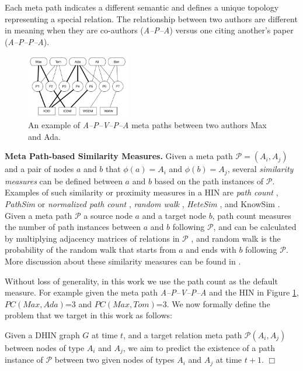 Each meta path indicates a different semantic and defines a unique topology representing a special relation. The relationship between two authors are different in meaning when they are co-authors (\textit{A--P--A}) versus one citing another's paper (\textit{A--P--P--A}).

\begin{figure}[t]
\centering
\includegraphics[width=0.4\textwidth]{figs/exampleSocialNetwork.pdf}
\caption{An example of \textit{A--P--V--P--A} meta paths between two authors Max and Ada.}
\label{sampleNetwork}
\end{figure}

\textbf{Meta Path-based Similarity Measures.} Given a meta path $\mathcal{P} = (A_i,A_j)$ and a pair of nodes $a$ and $b$ that $\phi(a)=A_i$ and $\phi(b)=A_{j}$, several \textit{similarity measures} can be defined between $a$ and $b$ based on the path instances of $\mathcal{P}$. Examples of such similarity or proximity measures in a HIN are \textit{path count} \cite{sun2011pathsim,sun2011ASONAM}, \textit{PathSim} \cite{sun2011pathsim} or \textit{normalized path count} \cite{sun2011ASONAM}, \textit{random walk} \cite{sun2011ASONAM}, \textit{HeteSim} \cite{shi2014hetesim}, and KnowSim \cite{wang2016text}. Given a meta path $\mathcal{P}$ a source node $a$ and a target node $b$, path count measures the number of path instances between $a$ and $b$ following $\mathcal{P}$, and can be calculated by multiplying adjacency matrices of relations in $\mathcal{P}$ \cite{sun2011ASONAM}, and random walk is the probability of the random walk that starts from $a$ and ends with $b$ following $\mathcal{P}$. More discussion about these similarity measures can be found in \cite{shi2014hetesim,sun2011ASONAM,sun2011pathsim}. 

Without loss of generality, in this work we use the path count as the default measure. For example given the meta path \textit{A--P--V--P--A} and the HIN in Figure \ref{sampleNetwork}, $PC(Max,Ada)$=3 and $PC(Max,Tom)$=3. We now formally define the problem that we target in this work as follows:

\begin{definition}\label{problemdef}Given a DHIN graph $G$ at time $t$, and a target relation meta path $\mathcal{P}(A_i,A_j)$ between nodes of type $A_i$ and $A_j$, we aim to predict the existence of a path instance of $\mathcal{P}$ between two given nodes of types $A_i$ and $A_j$ at time $t+1$. $\Box$ \end{definition}

